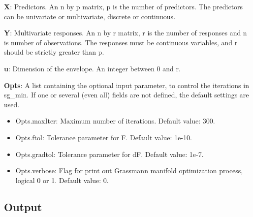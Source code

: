 \documentclass[a4paper,11pt,openany]{memoir}
\begin{document}
\begin{par}
\textbf{X}: Predictors. An n by p matrix, p is the number of predictors. The predictors can be univariate or multivariate, discrete or continuous.
\end{par} \vspace{1em}
\begin{par}
\textbf{Y}: Multivariate responses. An n by r matrix, r is the number of responses and n is number of observations. The responses must be continuous variables, and r should be strictly greater than p.
\end{par} \vspace{1em}
\begin{par}
\textbf{u}: Dimension of the envelope. An integer between 0 and r.
\end{par} \vspace{1em}
\begin{par}
\textbf{Opts}: A list containing the optional input parameter, to control the iterations in sg\_min. If one or several (even all) fields are not defined, the default settings are used.
\end{par} \vspace{1em}
\begin{itemize}
\setlength{\itemsep}{-1ex}
   \item Opts.maxIter: Maximum number of iterations.  Default value: 300.
   \item Opts.ftol: Tolerance parameter for F.  Default value: 1e-10.
   \item Opts.gradtol: Tolerance parameter for dF.  Default value: 1e-7.
   \item Opts.verbose: Flag for print out Grassmann manifold optimization process, logical 0 or 1. Default value: 0.
\end{itemize}


\subsection*{Output}
\end{document}
